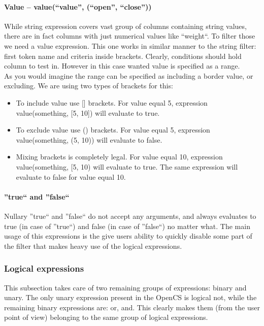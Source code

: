 \paragraph{Value -- value(``value'', (``open'', ``close''))}
While string expression covers vast group of columns containing string values, there are in fact columns with just numerical values like ``weight``. To filter those we need a value expression. This one works in similar manner to the string filter: first token name and criteria inside brackets. Clearly, conditions should hold column to test in. However in this case wanted value is specified as a range.\\
As you would imagine the range can be specified as including a border value, or excluding. We are using two types of brackets for this:
\begin{itemize}
 \item To include value use [] brackets. For value equal 5, expression value(something, [5, 10]) will evaluate to true.
 \item To exclude value use () brackets. For value equal 5, expression value(something, (5, 10)) will evaluate to false.
 \item Mixing brackets is completely legal. For value equal 10, expression value(something, [5, 10) will evaluate to true. The same expression will evaluate to false for value equal 10.
\end{itemize}

\paragraph{''true`` and ''false``}
Nullary ''true`` and ''false`` do not accept any arguments, and always evaluates to true (in case of ''true``) and false (in case of ''false``) no matter what. The main usage of this expressions is the give users ability to quickly disable some part of the filter that makes heavy use of the logical expressions. 

\subsubsection{Logical expressions}
This subsection takes care of two remaining groups of expressions: binary and unary. The only unary expression present in the OpenCS is logical not, while the remaining binary expressions are: or, and. This clearly makes them (from the user point of view) belonging to the same group of logical expressions.

